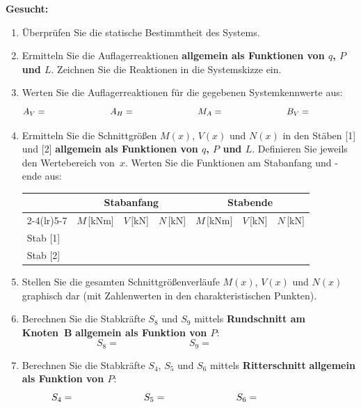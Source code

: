 \documentclass[a4paper,11pt]{article}
\begin{document}
\textbf{Gesucht:}
\begin{enumerate}[leftmargin=*, label=\arabic*.]
  \item Überprüfen Sie die statische Bestimmtheit des Systems.
  \item Ermitteln Sie die Auflagerreaktionen \textbf{allgemein als Funktionen von $q$, $P$ und $L$}.
        Zeichnen Sie die Reaktionen in die Systemskizze ein.
  \item Werten Sie die Auflagerreaktionen für die gegebenen Systemkennwerte aus:
        \[
          A_V = \hspace{2.5cm}
          A_H = \hspace{2.5cm}
          M_A = \hspace{2.5cm}
          B_V = \hspace{2.5cm}
        \]
  \item Ermitteln Sie die Schnittgrößen $M(x)$, $V(x)$ und $N(x)$ in den Stäben [1] und [2]
        \textbf{allgemein als Funktionen von $q$, $P$ und $L$}.
        Definieren Sie jeweils den Wertebereich von~$x$.
        Werten Sie die Funktionen am Stabanfang und -ende aus:

        \medskip
        \begin{tabular}{l cccccc}
        \toprule
         & \multicolumn{3}{c}{\textbf{Stabanfang}} & \multicolumn{3}{c}{\textbf{Stabende}} \\
        \cmidrule(lr){2-4}\cmidrule(lr){5-7}
         & $M$\,[kNm] & $V$\,[kN] & $N$\,[kN]
         & $M$\,[kNm] & $V$\,[kN] & $N$\,[kN] \\
        \midrule
        Stab [1] & & & & & & \\[6pt]
        Stab [2] & & & & & & \\
        \bottomrule
        \end{tabular}

  \item Stellen Sie die gesamten Schnittgrößenverläufe $M(x)$, $V(x)$ und $N(x)$ graphisch dar
        (mit Zahlenwerten in den charakteristischen Punkten).

  \item Berechnen Sie die Stabkräfte $S_8$ und $S_9$ mittels \textbf{Rundschnitt am Knoten~B}
        \textbf{allgemein als Funktion von $P$}:
        \[
          S_8 = \hspace{3cm} S_9 = \hspace{3cm}
        \]

  \item Berechnen Sie die Stabkräfte $S_4$, $S_5$ und $S_6$ mittels \textbf{Ritterschnitt}
        \textbf{allgemein als Funktion von $P$}:
        \[
          S_4 = \hspace{2.5cm} S_5 = \hspace{2.5cm} S_6 = \hspace{2.5cm}
        \]
\end{enumerate}
\end{document}
